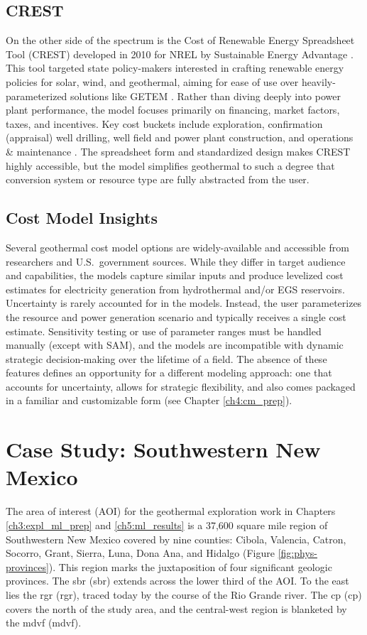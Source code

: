 \subsection{CREST}\label{ch2:crest}
On the other side of the spectrum is the Cost of Renewable Energy Spreadsheet Tool (CREST) developed in 2010 for NREL by Sustainable Energy Advantage \citep{gifford_crest_2013}. This tool targeted state policy-makers interested in crafting renewable energy policies for solar, wind, and geothermal, aiming for ease of use over heavily-parameterized solutions like GETEM \citep{gifford_renewable_2011}. Rather than diving deeply into power plant performance, the model focuses primarily on financing, market factors, taxes, and incentives. Key cost buckets include exploration, confirmation (appraisal) well drilling, well field and power plant construction, and operations \& maintenance \citep{gifford_crest_2013}. The spreadsheet form and standardized design makes CREST highly accessible, but the model simplifies geothermal to such a degree that conversion system or resource type are fully abstracted from the user. 

\subsection{Cost Model Insights}\label{ch2:cost_model_insights}
Several geothermal cost model options are widely-available and accessible from researchers and U.S.\ government sources. While they differ in target audience and capabilities, the models capture similar inputs and produce levelized cost estimates for electricity generation from hydrothermal and/or EGS reservoirs. Uncertainty is rarely accounted for in the models. Instead, the user parameterizes the resource and power generation scenario and typically receives a single cost estimate. Sensitivity testing or use of parameter ranges must be handled manually (except with SAM), and the models are incompatible with dynamic strategic decision-making over the lifetime of a field. The absence of these features defines an opportunity for a different modeling approach: one that accounts for uncertainty, allows for strategic flexibility, and also comes packaged in a familiar and customizable form (see Chapter \ref{ch4:cm_prep}). 

\section{Case Study: Southwestern New Mexico}\label{ch2:case_outline}
The area of interest (AOI) for the geothermal exploration work in Chapters \ref{ch3:expl_ml_prep} and \ref{ch5:ml_results} is a 37,600 square mile region of Southwestern New Mexico covered by nine counties: Cibola, Valencia, Catron, Socorro, Grant, Sierra, Luna, Dona Ana, and Hidalgo (Figure \ref{fig:phys-provinces}). This region marks the juxtaposition of four significant geologic provinces. The \acrlong{sbr} (\acrshort{sbr}) extends across the lower third of the AOI. To the east lies the \acrlong{rgr} (\acrshort{rgr}), traced today by the course of the Rio Grande river. The \acrlong{cp} (\acrshort{cp}) covers the north of the study area, and the central-west region is blanketed by the \acrlong{mdvf} (\acrshort{mdvf}).

